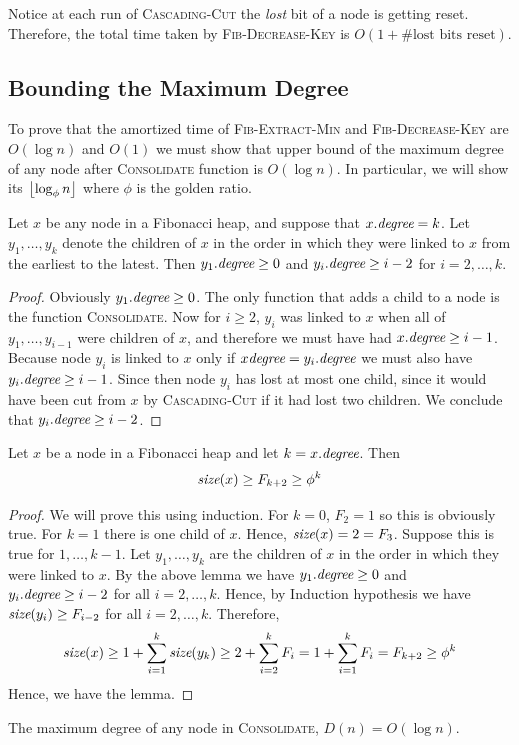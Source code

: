 Notice at each run of \textsc{Cascading-Cut} the \emph{lost} bit of a node is getting reset. Therefore, the total time taken by \textsc{Fib-Decrease-Key} is $O(1+\#\text{lost bits reset})$.
\subsection{Bounding the Maximum Degree}\label{max-degree-bound}
To prove that the amortized time of \textsc{Fib-Extract-Min} and \textsc{Fib-Decrease-Key} are $O(\log n)$  and $O(1)$ we must show that upper bound of the maximum degree of any node after \textsc{Consolidate} function is $O(\log n)$. In particular, we will show its $\left\lfloor \log_{\phi}n\right\rfloor$ where $\phi$ is the golden ratio.
\begin{lemma}{}{}
	Let $x$ be any node in a Fibonacci heap, and suppose that $x.\emph{degree}=k$. Let $y_1,\dots, y_k$ denote the children of $x$ in the order in which they were linked to $x$ from the earliest to the latest. Then $y_1.\emph{degree}\geq 0$ and $y_i.\emph{degree}\geq i-2$ for $i=2,\dots, k$.
\end{lemma}
\begin{proof}
	Obviously $y_1.\emph{degree}\geq 0$. The only function that adds a child to a node is the function \textsc{Consolidate}. Now for $i\geq 2$, $y_i$ was linked to $x$ when all of $y_1,\dots, y_{i-1}$ were children of $x$, and therefore we must have had $x.\emph{degree}\geq i-1$. Because node $y_i$ is linked to $x$ only if $x\emph{degree}=y_i.\emph{degree}$ we must also have $y_i.\emph{degree}\geq i-1$. Since then node $y_i$ has lost at most one child, since it would have been cut from $x$ by \textsc{Cascading-Cut} if it had lost two children. We conclude that $y_i.\emph{degree}\geq i-2$.
\end{proof}
\begin{lemma}{}{}
	Let $x$ be a node in a Fibonacci heap and let $k=x.\emph{degree}$. Then $$\emph{size}(x)\geq F_{k+2}\geq \phi^k$$
\end{lemma}
\begin{proof}
	We will prove this using induction. For $k=0$, $F_2=1$ so this is obviously true. For $k=1$ there is one child of $x$. Hence, $\emph{size}(x)=2=F_3$. Suppose this is true for $1,\dots, k-1$. Let $y_1,\dots, y_k$ are the children of $x$  in the order in which they were linked to $x$. By the above lemma we have $y_1.\emph{degree}\geq 0$ and $y_i.\emph{degree}\geq i-2$ for all $i=2,\dots, k$. Hence, by Induction hypothesis we have $\emph{size}(y_i)\geq F_{i-2}$ for all $i=2,\dots, k$. Therefore, \[
		\emph{size}(x) \geq 1+\sum\limits_{i=1}^{k}\emph{size}(y_k)\geq 2+\sum\limits_{i=2}^kF_{i}=1+\sum\limits_{i=1}^k F_i=F_{k+2}\geq \phi^k
	\]Hence, we have the lemma.
\end{proof}
\begin{corollary}{}{}
	The maximum degree of any node in \textsc{Consolidate}, $D(n)=O(\log n)$.
\end{corollary}
